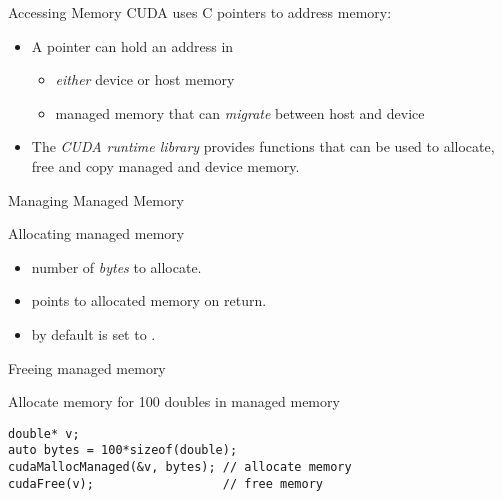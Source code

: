 \documentclass[aspectratio=43]{beamer}
\begin{document}
\begin{frame}[fragile]{Accessing Memory}
    CUDA uses C pointers to address memory:
    \begin{center}
        \centering {}
    \end{center}
        \begin{itemize}
            \item A pointer can hold an address in
            \begin{itemize}
                \item \emph{either} device or host memory
                \item managed memory that can \emph{migrate} between host and device
            \end{itemize}
            \item The \emph{CUDA runtime library} provides functions that can be used to allocate, free and copy managed and device memory.
        \end{itemize}
\end{frame}

\begin{frame}[fragile]{Managing Managed Memory}
    \begin{info}{Allocating managed memory}
        \centering {}
    \begin{itemize}
        \item {} number of \emph{bytes} to allocate.
        \item {} points to allocated memory on return.
        \item {} by default is set to .
    \end{itemize}
    \end{info}

    \begin{info}{Freeing managed memory}
        \centering {}
    \end{info}

    \begin{code}{Allocate memory for 100 doubles in managed memory}
\begin{lstlisting}[style=boxcuda]
double* v;
auto bytes = 100*sizeof(double);
cudaMallocManaged(&v, bytes); // allocate memory
cudaFree(v);                  // free memory
\end{lstlisting}
    \end{code}
\end{frame}
\end{document}
